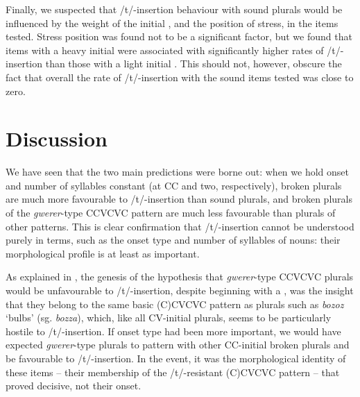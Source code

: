 \documentclass[output=paper]{langsci/langscibook}
\begin{document}
Finally, we suspected that /t/-insertion behaviour with sound plurals would be influenced by the weight of the initial , and the position of stress, in the  items tested. Stress position was found not to be a significant factor, but we found that items with a heavy initial  were associated with significantly higher rates of /t/-insertion than those with a light initial . This should not, however, obscure the fact that overall the rate of /t/-insertion with the sound  items tested was close to zero.

\section{Discussion}

We have seen that the two main predictions were borne out: when we hold onset and number of syllables constant (at CC and two, respectively), broken plurals are much more favourable to /t/-insertion than sound plurals, and broken plurals of the \textit{gwerer}{}-type CCVCVC pattern are much less favourable than plurals of other patterns. This is clear confirmation that /t/-insertion cannot be understood purely in  terms, such as the onset type and number of syllables of  nouns: their morphological profile is at least as important.

As explained in , the genesis of the hypothesis that \textit{gwerer}{}-type CCVCVC plurals would be unfavourable to /t/-insertion, despite beginning with a , was the insight that they belong to the same basic (C)CVCVC pattern as plurals such as \textit{bozoz} ‘bulbs’ (sg. \textit{bozza}), which, like all CV-initial plurals, seems to be particularly hostile to /t/-insertion. If onset type had been more important, we would have expected \textit{gwerer}{}-type plurals to pattern with other CC-initial broken plurals and be favourable to /t/-insertion. In the event, it was the morphological identity of these items – their membership of the /t/-resistant (C)CVCVC pattern – that proved decisive, not their onset. 
\end{document}
